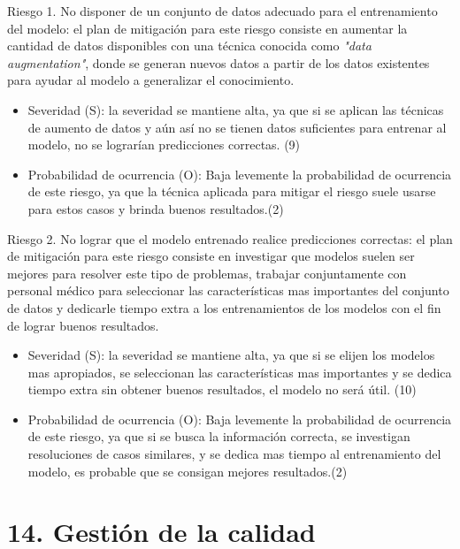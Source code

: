 \documentclass[
11pt, %
]{charter}
\begin{document}
Riesgo 1. No disponer de un conjunto de datos adecuado para el entrenamiento del modelo: el plan de mitigación para este riesgo consiste en aumentar la cantidad de datos disponibles con una técnica conocida como \textit{"data augmentation"}, donde se generan nuevos datos a partir de los datos existentes para ayudar al modelo a generalizar el conocimiento.
\begin{itemize}
	\item Severidad (S): la severidad se mantiene alta, ya que si se aplican las técnicas de aumento de datos y aún así no se tienen datos suficientes para entrenar al modelo, no se lograrían predicciones correctas. (9)
	\item Probabilidad de ocurrencia (O): Baja levemente la probabilidad de ocurrencia de este riesgo, ya que la técnica aplicada para mitigar el riesgo suele usarse para estos casos y brinda buenos resultados.(2)
\end{itemize}

Riesgo 2. No lograr que el modelo entrenado realice predicciones correctas: el plan de mitigación para este riesgo consiste en investigar que modelos suelen ser mejores para resolver este tipo de problemas, trabajar conjuntamente con personal médico para seleccionar las características mas importantes del conjunto de datos y dedicarle tiempo extra a los entrenamientos de los modelos con el fin de lograr buenos resultados.
\begin{itemize}
	\item Severidad (S): la severidad se mantiene alta, ya que si se elijen los modelos mas apropiados, se seleccionan las características mas importantes y se dedica tiempo extra sin obtener buenos resultados, el modelo no será útil. (10)
	\item Probabilidad de ocurrencia (O): Baja levemente la probabilidad de ocurrencia de este riesgo, ya que si se busca la información correcta, se investigan resoluciones de casos similares, y se dedica mas tiempo al entrenamiento del modelo, es probable que se consigan mejores resultados.(2)
\end{itemize}

\section{14. Gestión de la calidad}
\label{sec:calidad}
\end{document}
